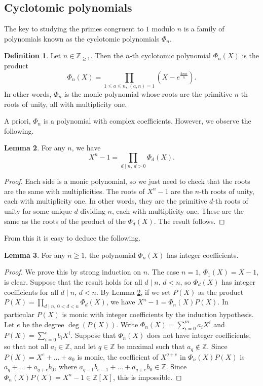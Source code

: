 \documentclass{article}
\newcommand{\Z}{\mathbb{Z}}
\newcommand{\rb}[1]{\left( #1 \right)}
\renewcommand{\sb}[1]{\left[ #1 \right]}
\theoremstyle{definition}\newtheorem{definition}{Definition}
\theoremstyle{definition}\newtheorem{remark}[definition]{Remark}
\theoremstyle{definition}\newtheorem*{example}{Example}
\theoremstyle{definition}\newtheorem*{note}{Note}
\newtheorem{lemma}[definition]{Lemma}
\begin{document}
\subsection{Cyclotomic polynomials}

The key to studying the primes congruent to $ 1 $ modulo $ n $ is a family of polynomials known as the cyclotomic polynomials $ \Phi_n $.

\begin{definition}
Let $ n \in \Z_{\ge 1} $. Then the $ n $-th cyclotomic polynomial $ \Phi_n\rb{X} $ is the product
$$ \Phi_n\rb{X} = \prod_{1 \le a \le n, \ \rb{a, n} = 1} \rb{X - e^{\tfrac{2\pi ai}{n}}}. $$
In other words, $ \Phi_n $ is the monic polynomial whose roots are the primitive $ n $-th roots of unity, all with multiplicity one.
\end{definition}

A priori, $ \Phi_n $ is a polynomial with complex coefficients. However, we observe the following.

\begin{lemma}
\label{lem:95}
For any $ n $, we have
$$ X^n - 1 = \prod_{d \mid n, \ d > 0} \Phi_d\rb{X}. $$
\end{lemma}

\begin{proof}
Each side is a monic polynomial, so we just need to check that the roots are the same with multiplicities. The roots of $ X^n - 1 $ are the $ n $-th roots of unity, each with multiplicity one. In other words, they are the primitive $ d $-th roots of unity for some unique $ d $ dividing $ n $, each with multiplicity one. These are the same as the roots of the product of the $ \Phi_d\rb{X} $. The result follows.
\end{proof}

From this it is easy to deduce the following.

\begin{lemma}
For any $ n \ge 1 $, the polynomial $ \Phi_n\rb{X} $ has integer coefficients.
\end{lemma}

\begin{proof}
We prove this by strong induction on $ n $. The case $ n = 1 $, $ \Phi_1\rb{X} = X - 1 $, is clear. Suppose that the result holds for all $ d \mid n $, $ d < n $, so $ \Phi_d\rb{X} $ has integer coefficients for all $ d \mid n $, $ d < n $. By Lemma \ref{lem:95}, if we set $ P\rb{X} $ as the product $ P\rb{X} = \prod_{d \mid n, \ 0 < d < n} \Phi_d\rb{X} $, we have $ X^n - 1 = \Phi_n\rb{X}P\rb{X} $. In particular $ P\rb{X} $ is monic with integer coefficients by the induction hypothesis. Let $ e $ be the degree $ \deg\rb{P\rb{X}} $. Write $ \Phi_n\rb{X} = \sum_{i = 0}^m a_iX^i $ and $ P\rb{X} = \sum_{i = 0}^e b_iX^i $. Suppose that $ \Phi_n\rb{X} $ does not have integer coefficients, so that not all $ a_i \in \Z $, and let $ q \in \Z $ be maximal such that $ a_q \notin \Z $. Since $ P\rb{X} = X^e + \dots + a_0 $ is monic, the coefficient of $ X^{q + e} $ in $ \Phi_n\rb{X}P\rb{X} $ is $ a_q + \dots + a_{q + e}b_0 $, where $ a_{q - 1}b_{e - 1} + \dots + a_{q + e}b_0 \in \Z $. Since $ \Phi_n\rb{X}P\rb{X} = X^n - 1 \in \Z\sb{X} $, this is impossible.
\end{proof}
\end{document}
